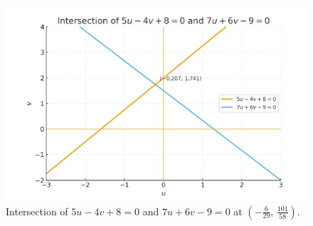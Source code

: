\documentclass[journal]{IEEEtran}
\numberwithin{equation}{enumi}
\numberwithin{figure}{enumi}
\begin{document}
\clearpage                       
\begin{figure}[H]
  \centering
  \includegraphics[width=0.8\linewidth]{figs/matgeo-5.2.2.jpeg}
  \caption{Intersection of $5u-4v+8=0$ and $7u+6v-9=0$ at
           $\left(-\tfrac{6}{29},\,\tfrac{101}{58}\right)$.}
  \label{fig:5.2.2}
\end{figure}





 
\end{document}
